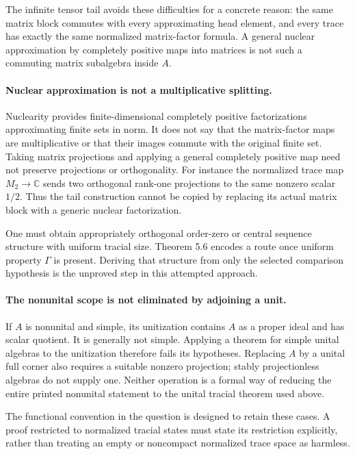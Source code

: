 \documentclass[11pt]{article}
\begin{document}
The infinite tensor tail avoids these difficulties for a concrete
reason: the same matrix block commutes with every approximating
head element, and every trace has exactly the same normalized
matrix-factor formula. A general nuclear approximation by
completely positive maps into matrices is not such a commuting
matrix subalgebra inside $A$.

\paragraph{Nuclear approximation is not a multiplicative splitting.}
Nuclearity provides finite-dimensional completely positive
factorizations approximating finite sets in norm. It does not
say that the matrix-factor maps are multiplicative or that their
images commute with the original finite set. Taking matrix
projections and applying a general completely positive map need
not preserve projections or orthogonality. For instance the
normalized trace map $M_2\to\mathbb C$ sends two orthogonal
rank-one projections to the same nonzero scalar $1/2$.
Thus the tail construction cannot be copied by replacing its
actual matrix block with a generic nuclear factorization.

One must obtain appropriately orthogonal order-zero or central
sequence structure with uniform tracial size. Theorem 5.6
encodes a route once uniform property $\Gamma$ is present.
Deriving that structure from only the selected comparison
hypothesis is the unproved step in this attempted approach.

\paragraph{The nonunital scope is not eliminated by adjoining a unit.}
If $A$ is nonunital and simple, its unitization contains $A$
as a proper ideal and has scalar quotient. It is generally not
simple. Applying a theorem for simple unital algebras to the
unitization therefore fails its hypotheses. Replacing $A$ by
a unital full corner also requires a suitable nonzero projection;
stably projectionless algebras do not supply one. Neither
operation is a formal way of reducing the entire printed
nonunital statement to the unital tracial theorem used above.

The functional convention in the question is designed to retain
these cases. A proof restricted to normalized tracial states
must state its restriction explicitly, rather than treating an
empty or noncompact normalized trace space as harmless.
\end{document}
